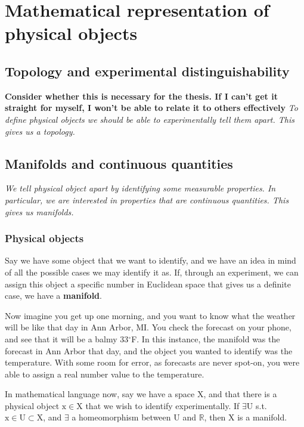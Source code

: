 \documentclass{book}
\begin{document}
\tableofcontents

\chapter{Mathematical representation of physical objects}

\section{Topology and experimental distinguishability}
\textbf{Consider whether this is necessary for the thesis. If I can't get it straight for myself, I won't be able to relate it to others effectively}
\textit{To define physical objects we should be able to experimentally tell them apart. This gives us a topology.}

\section{Manifolds and continuous quantities}
\textit{We tell physical object apart by identifying some measurable properties. In particular, we are interested in properties that are continuous quantities. This gives us manifolds.}

\subsection{Physical objects}

Say we have some object that we want to identify, and we have an idea in mind of all the possible cases we may identify it as. If, through an experiment, we can assign this object a specific number in Euclidean space that gives us a definite case, we have a \textbf{manifold}.
 
Now imagine you get up one morning, and you want to know what the weather will be like that day in Ann Arbor, MI. You check the forecast on your phone, and see that it will be a balmy 33$^{\circ}$F. In this instance, the manifold was the forecast in Ann Arbor that day, and the object you wanted to identify was the temperature. With some room for error, as forecasts are never spot-on, you were able to assign a real number value to the temperature. 

In mathematical language now, say we have a space $\mathrm{X}$, and that there is a physical object $\mathrm{x} \in \mathrm{X}$ that we wish to identify experimentally. If $\exists \mathrm{U}$ s.t. $\mathrm{x} \in \mathrm{U} \subset \mathrm{X}$, and $\exists$ a homeomorphism between $\mathrm{U}$ and $\mathbb{R}$, then $\mathrm{X}$ is a manifold.
\end{document}
